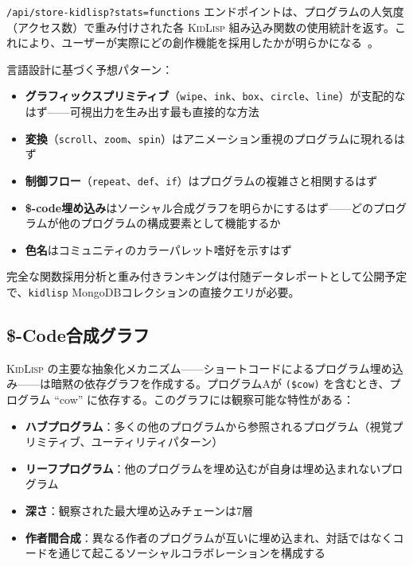 \documentclass[10pt,letterpaper,twocolumn]{article}
\newcommand{\kl}{\textsc{KidLisp}}
\begin{document}
\texttt{/api/store-kidlisp?stats=functions} エンドポイントは、プログラムの人気度（アクセス数）で重み付けされた各 \kl{} 組み込み関数の使用統計を返す。これにより、ユーザーが実際にどの創作機能を採用したかが明らかになる~\citep{scudder2026kidlisp}。

言語設計に基づく予想パターン：
\begin{itemize}
  \item \textbf{グラフィックスプリミティブ}（\texttt{wipe}、\texttt{ink}、\texttt{box}、\texttt{circle}、\texttt{line}）が支配的なはず——可視出力を生み出す最も直接的な方法
  \item \textbf{変換}（\texttt{scroll}、\texttt{zoom}、\texttt{spin}）はアニメーション重視のプログラムに現れるはず
  \item \textbf{制御フロー}（\texttt{repeat}、\texttt{def}、\texttt{if}）はプログラムの複雑さと相関するはず
  \item \textbf{\$-code埋め込み}はソーシャル合成グラフを明らかにするはず——どのプログラムが他のプログラムの構成要素として機能するか
  \item \textbf{色名}はコミュニティのカラーパレット嗜好を示すはず
\end{itemize}

完全な関数採用分析と重み付きランキングは付随データレポートとして公開予定で、\texttt{kidlisp} MongoDBコレクションの直接クエリが必要。

\subsection{\$-Code合成グラフ}

\kl{} の主要な抽象化メカニズム——ショートコードによるプログラム埋め込み——は暗黙の依存グラフを作成する。プログラムAが \texttt{(\$cow)} を含むとき、プログラム ``cow'' に依存する。このグラフには観察可能な特性がある：

\begin{itemize}
  \item \textbf{ハブプログラム}：多くの他のプログラムから参照されるプログラム（視覚プリミティブ、ユーティリティパターン）
  \item \textbf{リーフプログラム}：他のプログラムを埋め込むが自身は埋め込まれないプログラム
  \item \textbf{深さ}：観察された最大埋め込みチェーンは7層
  \item \textbf{作者間合成}：異なる作者のプログラムが互いに埋め込まれ、対話ではなくコードを通じて起こるソーシャルコラボレーションを構成する
\end{itemize}
\end{document}
